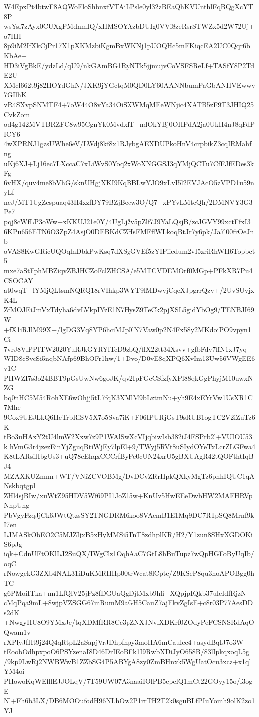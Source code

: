 W4EpxPt4btwF8AQWoFloShbnxfVTAiLPsle0yl32zBEaQhKVUnthlFqBQgXcYT8P
wsYsl7zAyx0CUXgPMdnmIQ/xHMSOYAzbDUIg0VVi8zeRsrSTWZx5d2W72Uj+o7HH
8p9iM2IfXkCjPr17X1pXKMzbiKgmBxWKNj1pUOQHc5mFKiqcEA2UC0Qqr6bKbAe+
HD3iVgBkE/ydzLd/qU9/nkGAmBG1RyNTk5jjmujvCoVSFSReLf+TASfY8P2TdE2U
XMcl662t9j82HOYdGhN/JXK9jYGctqM0QD0LY60AANNbumPaGbANHVEwwv7GIlhK
vR4SXvpSNMTF4+7oW44O8vYa34OiSXWMqMEeWNjic4XATB5zF9T3JHIQ25CvkZom
od4g142MVTBRZFC8w95CgnYk0MvdxfT+ndOkYBj0OHPdA2ja0UkH4nJ8qFdPICY6
4wXPRNJ1gzsUWhe6eV/LWdj8kf8x1RJybgAEXDUPkoHnV4crpbikZ3cqIRMahfng
uKj6XJ+Lj16ec7LXccaC7xLiWvS0Yoq2xWoXNGGSJ3qYMjQCTu7CfFJfEDes3kFg
6vHX/quv4me8bVhG/sknUHgjXKI9KqBBLwYJO9xLvI5l2EVJAcO5zVPD1u59nyLf
ncJ/MT1UgZcspuaq43II4xzfDY79BZjBecw3O/Q7+xPYvLMtcQh/2DMNVY3G3Pe7
pqj8cWfLP3oWw+xKKUJ21e0Y/4UgLj2v5pZlf7J9YaLQsjB/zcJGVY99xctFfxI3
6KPu656ETN6O3ZpZ4AsjO0DEBKdCZHsFMFflWLkoqBtJr7y6pk/Ja7l00frOeJnb
oVAS8KwGRicUQOqlnDbkPwKsq7dXSgGVEf5zYIPiiedum2vI5zriRhWH6Topbct5
mxe7aStFphMBZiqvZBJHCZoFclZHCSA/e5MTCVDEMOrf0MGp+PFkXR7Pu4CSOCAY
at0wqT+lYMjQLtsmNQRQ18rVIhkp3WYT9lMDwvjCqeXJpgrrQzv+/2UvSUvjxK4L
ZfMOJEiJmVxTdyha6dvLVkpIYzE1N7HysZ9TeCk2pjXSL5gidYbOg9/TENBJI69W
+fX1iRJlM99X+/lgDG3Vq8YP6hciMJp0lN7Vaw0p2N4Fx58y2MKdoiPO9vpyn1Ci
7vrJ8VlPPITW2020YuRJkGYRYlTcD9zbQ/flX22tt34Xsvv+gfbFdv7ffN1xJ7yq
WID8cSveSi5nqbNAfp69BhOFr1hw/1+Dvo/D0vE8qXPQ6XvIm13Uw56VWgEE6v1C
PHWZI7s3o24BBT9pGsUwNw6goJK/qv2IpFGcCSfzfyXPl88qkGgPhyjM10uwxNZG
bq0nHC5M54RohXE6wOhjj5tL7fqK3XMlM9bLztmNu+yh9E4xEYrVw1UsXR1C7Mhe
9Cox9UEJLkQ6HcTrbRiSV5X7o5Sva7iK+F06IPURjGsT9sRUB1ogTC2V2iZuTz6K
tBo3uHAxY2tU4lmW2Xxw7z9P1WAlSwXcVIjqbiwIsb382iJ4FSPrb2l+VUIOU53k
hVmG3r4jzezEinYjZguqBtiWjEy7lpEl+9/TWyj5RVt8uSIydOYeTxLcrZLGFwa4
K8tLARsiHbgUs3+uQ78cEhqxCCCrfByPe0cUN24xrU5gBXUAgR42tQOFthtIqBJ4
MZAXKUZmnn+WT/VNiZCVOBMg/DvDCvZRrHpkQXkyMgTz6pnhIQUC1qANskbqtgpl
ZHl4sjBIw/xuWtZ95HDV5Wf69PI1JoZ15w+KnUv5HwEEeDwbHW2MAFHRVpNhpUng
PbVgyFzqJjCk6JWtQtzsSY2TNGDRM6koo8VAemB1E1Mq9DC7RTpSQ8Mrnf9kI7en
LJMASkObEO2C5MJZIjxB5xHyMMSi5TnT8zdhplKR/H2/Y1zun8SHxXGDOKiS6pJg
iqk+CdnUFtOKlLJ2SuQX/IWgClz1OqhAaC7GtL8hBuTupz7wQpHGFoByUqIb/oqC
rNowgekG3ZXb4NAL31iDuKMRHHp00trWcat8lCptc/Z9KSeP8qu3noAPOBgg0hTC
g6PMoiITka+nn1LfQlV25jPz8fDGUaQgDjtMxb9hfi+XQpjpIQkb37ulcIdfRjzN
cMqPqa9mL+8wjpVZSGG67mRumM9aGH5CauZ7ajFkvZgIsE+c8r03P77AesDDs2dK
+NwgyHU8O9YMxJe/tqXDMfRR8Cc3pZNXJNvlXDKrf0ZOdyPeFCSNSRdAqOQwam1v
rXPlyJfIIt9j24Q4qRtpL2aSapjVrJDhpfnpy3moHA6mCaulcc4+asydBqIJ7o3W
tEoobOdhpxpoO6PSYzenaI8D46DrIEoBFk1I9RwbXDiJyO658B/83lIpkqxoqL5g
/9kp9LwRj2NWBWwB1ZZbSG4P5ABYgA8zy0ZmBHnxk5WgUatOcu3xcz+x1qlYM4oi
PHowoKqWEfllEJJOLqV/7T59UW07A3naaiIOlPB5epelQ1mCt22GOyy15o/l3ogE
Nl+Fh6b3LX/DB6MOOufodH96NLhOw2P1rrTH2T2k0sguBLfPIuYomh9olK2zo1YJ
